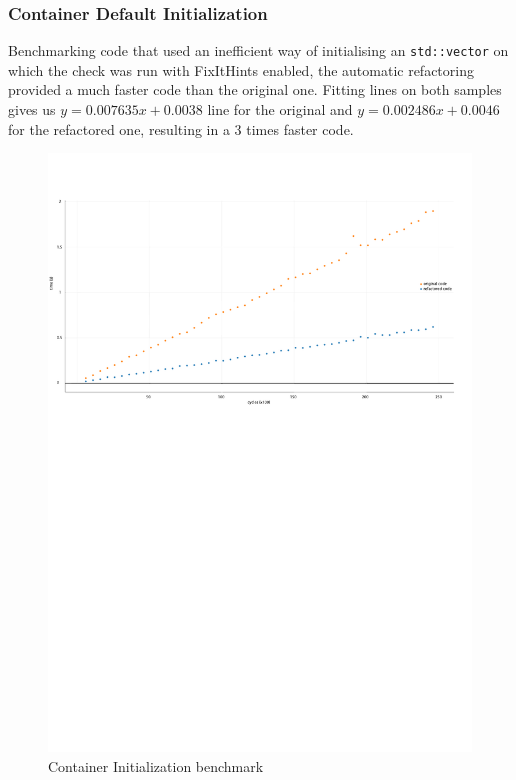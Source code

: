 \subsubsection{Container Default Initialization}
\par Benchmarking code that used an inefficient way of initialising an \verb|std::vector| on which the check was run with FixItHints enabled, the automatic refactoring provided a much faster code than the original one. Fitting lines on both samples gives us $y=0.007635x+0.0038$ line for the original and $y=0.002486x+0.0046$ for the refactored one, resulting in a 3 times faster code.
\begin{figure}[H]
	\caption{Container Initialization benchmark}
	\includegraphics[scale=0.7]{images/container_init_performance.pdf}
\end{figure}
